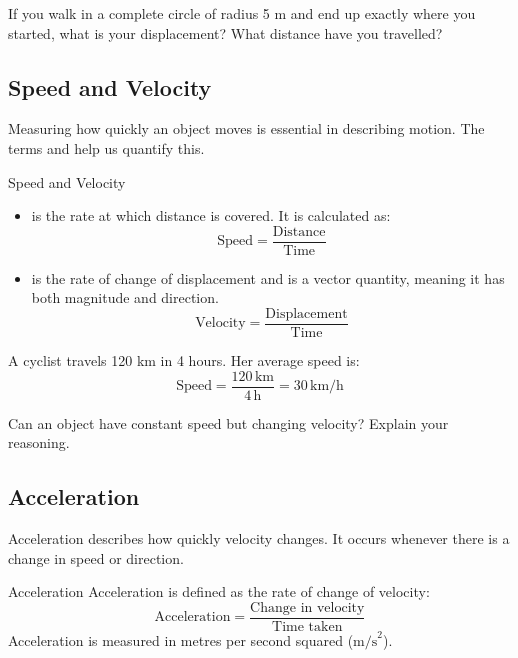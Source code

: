 \begin{stopandthink}
If you walk in a complete circle of radius 5 m and end up exactly where you started, what is your displacement? What distance have you travelled?
\end{stopandthink}

\subsection{Speed and Velocity}

Measuring how quickly an object moves is essential in describing motion. The terms  and  help us quantify this.

\begin{keyconcept}{Speed and Velocity}
\begin{itemize}
    \item {} is the rate at which distance is covered. It is calculated as:
    \[
    \text{Speed} = \frac{\text{Distance}}{\text{Time}}
    \]
    \item {} is the rate of change of displacement and is a vector quantity, meaning it has both magnitude and direction.
    \[
    \text{Velocity} = \frac{\text{Displacement}}{\text{Time}}
    \]
\end{itemize}
\end{keyconcept}


\begin{example}
A cyclist travels 120 km in 4 hours. Her average speed is:
\[
\text{Speed} = \frac{120\,\text{km}}{4\,\text{h}} = 30\,\text{km/h}
\]
\end{example}

\begin{stopandthink}
Can an object have constant speed but changing velocity? Explain your reasoning.
\end{stopandthink}

\subsection{Acceleration}

Acceleration describes how quickly velocity changes. It occurs whenever there is a change in speed or direction.

\begin{keyconcept}{Acceleration}
Acceleration is defined as the rate of change of velocity:
\[
\text{Acceleration} = \frac{\text{Change in velocity}}{\text{Time taken}}
\]
Acceleration is measured in metres per second squared (\(\text{m/s}^2\)).
\end{keyconcept}


